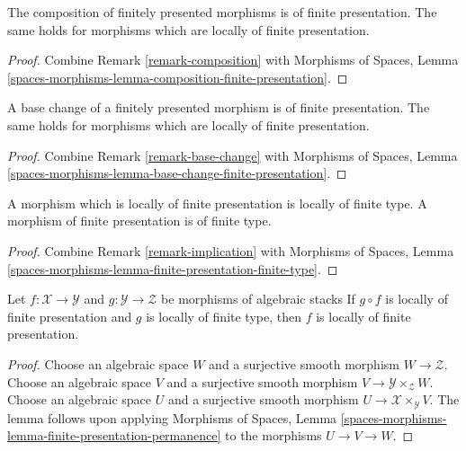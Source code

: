 \begin{lemma}
\label{lemma-composition-finite-presentation}
The composition of finitely presented morphisms is of finite presentation.
The same holds for morphisms which are locally of finite presentation.
\end{lemma}

\begin{proof}
Combine
Remark \ref{remark-composition}
with
Morphisms of Spaces, Lemma
\ref{spaces-morphisms-lemma-composition-finite-presentation}.
\end{proof}

\begin{lemma}
\label{lemma-base-change-finite-presentation}
A base change of a finitely presented morphism is of finite presentation.
The same holds for morphisms which are locally of finite presentation.
\end{lemma}

\begin{proof}
Combine
Remark \ref{remark-base-change}
with
Morphisms of Spaces, Lemma
\ref{spaces-morphisms-lemma-base-change-finite-presentation}.
\end{proof}

\begin{lemma}
\label{lemma-finite-presentation-finite-type}
A morphism which is locally of finite presentation is locally of finite type.
A morphism of finite presentation is of finite type.
\end{lemma}

\begin{proof}
Combine
Remark \ref{remark-implication}
with
Morphisms of Spaces, Lemma
\ref{spaces-morphisms-lemma-finite-presentation-finite-type}.
\end{proof}

\begin{lemma}
\label{lemma-finite-presentation-permanence}
Let $f : \mathcal{X} \to \mathcal{Y}$ and
$g : \mathcal{Y} \to \mathcal{Z}$ be morphisms of algebraic stacks
If $g \circ f$ is locally of finite presentation and $g$ is locally of
finite type, then $f$ is locally of finite presentation.
\end{lemma}

\begin{proof}
Choose an algebraic space $W$ and a surjective smooth morphism
$W \to \mathcal{Z}$.
Choose an algebraic space $V$ and a surjective smooth morphism
$V \to \mathcal{Y} \times_\mathcal{Z} W$.
Choose an algebraic space $U$ and a surjective smooth morphism
$U \to \mathcal{X} \times_\mathcal{Y} V$.
The lemma follows upon applying
Morphisms of Spaces, Lemma
\ref{spaces-morphisms-lemma-finite-presentation-permanence}
to the morphisms $U \to V \to W$.
\end{proof}

